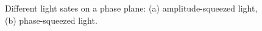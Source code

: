 \begin{figure}[h]
	\begin{minipage}{0.5 \linewidth}
	\end{minipage}
	\hfill
	\begin{minipage}{0.5 \linewidth}
	\end{minipage}
	\caption{Different light sates on a phase plane: (a) amplitude-squeezed light, (b) phase-squeezed light.}
	\label{fig:sheeeeeeit}
\end{figure}

